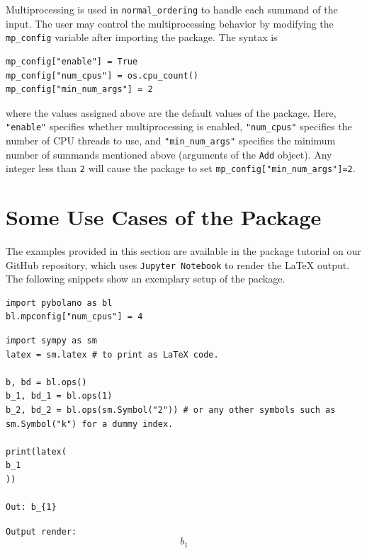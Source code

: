 \documentclass[5p, twocolumn, 10pt, sort&compress]{elsarticle}
\newcommand{\inlinecode}[1]{\texttt{#1}}
\newenvironment{revision2}{%
\color{red}
}
{}
\begin{document}
Multiprocessing is used in \inlinecode{normal_ordering} to handle each summand of the input. The user may control the multiprocessing behavior by modifying the \inlinecode{mp_config} variable after importing the package. The syntax is
\begin{verbatim}
mp_config["enable"] = True
mp_config["num_cpus"] = os.cpu_count()
mp_config["min_num_args"] = 2
\end{verbatim}
where the values assigned above are the default values of the package. Here, \inlinecode{"enable"} specifies whether multiprocessing is enabled, \inlinecode{"num_cpus"} specifies the number of CPU threads to use, and \inlinecode{"min_num_args"} specifies the minimum number of summands mentioned above (arguments of the \inlinecode{Add} object). Any integer less than \inlinecode{2} will cause the package to set \inlinecode{mp_config["min_num_args"]=2}. 


\section{Some Use Cases of the Package}\label{section:examples}

The examples provided in this section are available in the package tutorial on our GitHub repository, which uses \texttt{Jupyter Notebook} to render the \LaTeX{} output. The following snippets show an exemplary setup of the package.
\begin{verbatim}
import pybolano as bl
bl.mpconfig["num_cpus"] = 4
\end{verbatim}

\begin{verbatim}
import sympy as sm
latex = sm.latex # to print as LaTeX code.

b, bd = bl.ops()
b_1, bd_1 = bl.ops(1)
b_2, bd_2 = bl.ops(sm.Symbol("2")) # or any other symbols such as sm.Symbol("k") for a dummy index.

print(latex(
b_1
))

Out: b_{1}
\end{verbatim}
\begin{revision2}
\noindent \noindent\inlinecode{Output render:}
\begin{equation*}
    b_{1}
\end{equation*}
\end{revision2}
\end{document}
